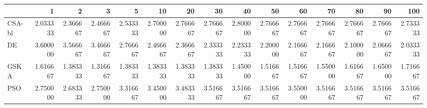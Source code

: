 \begin{tabular}{lrrrrrrrrrrrrrr}
\toprule
{} &       1   &       2   &       3   &       5   &       10  &       20  &       30  &       40  &       50  &       60  &       70  &       80  &       90  &       100 \\
\midrule
CSA-bl &  2.033333 &  2.366667 &  2.466667 &  2.533333 &  2.700000 &  2.766667 &  2.766667 &  2.800000 &  2.766667 &  2.766667 &  2.766667 &  2.766667 &  2.766667 &  2.733333 \\
DE     &  3.600000 &  3.566667 &  3.466667 &  2.766667 &  2.466667 &  2.366667 &  2.333333 &  2.233333 &  2.200000 &  2.166667 &  2.166667 &  2.100000 &  2.066667 &  2.033333 \\
GSKA   &  1.616667 &  1.383333 &  1.316667 &  1.383333 &  1.383333 &  1.383333 &  1.383333 &  1.450000 &  1.516667 &  1.516667 &  1.550000 &  1.616667 &  1.650000 &  1.716667 \\
PSO    &  2.750000 &  2.683333 &  2.750000 &  3.316667 &  3.450000 &  3.483333 &  3.516667 &  3.516667 &  3.516667 &  3.550000 &  3.516667 &  3.516667 &  3.516667 &  3.516667 \\
\bottomrule
\end{tabular}
